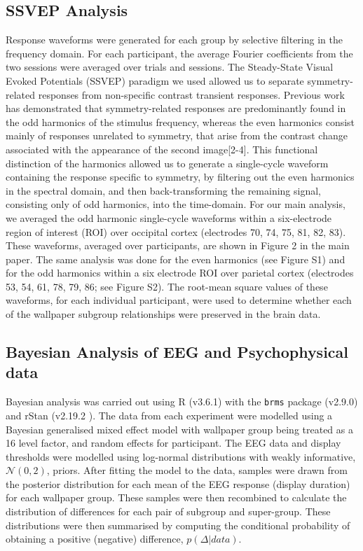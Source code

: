 \documentclass[9pt,twocolumn,twoside,lineno]{pnas-new}
\begin{document}
\subsection*{SSVEP Analysis}
Response waveforms were generated for each group by selective filtering in the frequency domain. For each participant, the average Fourier coefficients from the two sessions were averaged over trials and sessions. The Steady-State Visual Evoked Potentials (SSVEP) paradigm we used allowed us to separate symmetry-related responses from non-specific contrast transient responses. Previous work has demonstrated that symmetry-related responses are predominantly found in the odd harmonics of the stimulus frequency, whereas the even harmonics consist mainly of responses unrelated to symmetry, that arise from the contrast change associated with the appearance of the second image[2-4]. This functional distinction of the harmonics allowed us to generate a single-cycle waveform containing the response specific to symmetry, by filtering out the even harmonics in the spectral domain, and then back-transforming the remaining signal, consisting only of odd harmonics, into the time-domain. For our main analysis, we averaged the odd harmonic single-cycle waveforms within a six-electrode region of interest (ROI) over occipital cortex (electrodes 70, 74, 75, 81, 82, 83). These waveforms, averaged over participants, are shown in Figure 2 in the main paper. The same analysis was done for the even harmonics (see Figure S1) and for the odd harmonics within a six electrode ROI over parietal cortex (electrodes 53, 54, 61, 78, 79, 86; see Figure S2). The root-mean square values of these waveforms, for each individual participant, were used to determine whether each of the wallpaper subgroup relationships were preserved in the brain data.  

\subsection*{Bayesian Analysis of EEG and Psychophysical data}
Bayesian analysis was carried out using R (v3.6.1) \cite{R} with the \texttt{brms} package (v2.9.0) \cite{burkner2017} and rStan (v2.19.2 \cite{rStan}). The data from each experiment were modelled using a Bayesian generalised mixed effect model with wallpaper group being treated as a 16 level factor, and random effects for participant. The EEG data and display thresholds were modelled using log-normal distributions with weakly informative, $ \mathcal{N}(0, 2)$, priors. After fitting the model to the data, samples were drawn from the posterior distribution for each mean of the EEG response (display duration) for each wallpaper group. These samples were then recombined to calculate the distribution of differences for each pair of subgroup and super-group. These distributions were then summarised by computing the conditional probability of obtaining a positive (negative) difference, $p(\Delta | data)$.
\end{document}
